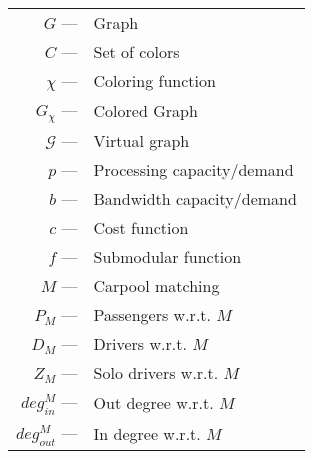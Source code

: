 \bgroup
\def\arraystretch{1.5}
\setlength\tabcolsep{2pt}
\begin{tabular}{r l}
$G$ --- &              Graph                                \\
$C$ --- &              Set of colors        \\
$\chi$ --- &           Coloring function    \\
$G_{\chi}$ --- &       Colored Graph         \\
$\mathcal{G}$ --- &    Virtual graph    \\
$p$ --- &              Processing capacity/demand   \\
$b$ --- &              Bandwidth capacity/demand    \\
$c$ --- &              Cost function    \\
$f$ --- &              Submodular function  \\
$M$ --- &              Carpool matching \\
$P_M$ --- &            Passengers w.r.t. $M$    \\
$D_M$ --- &            Drivers w.r.t. $M$   \\
$Z_M$ --- &            Solo drivers w.r.t. $M$  \\
$deg^M_{in}$ --- &     Out degree w.r.t. $M$    \\
$deg^M_{out}$ --- &    In degree w.r.t. $M$ \\
\end{tabular}
\egroup
